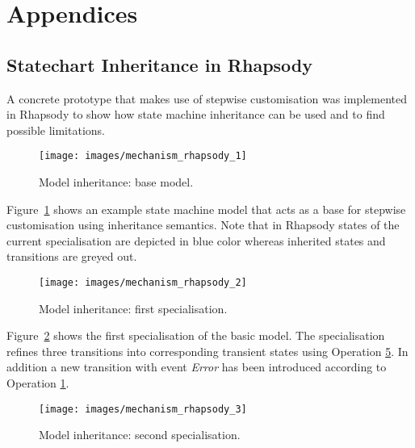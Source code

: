 \appendix

\section*{Appendices}
\renewcommand{\thesubsection}{\Alph{subsection}}

\label{annex:framework}

\subsection{Statechart Inheritance in Rhapsody\label{annex:proto_inheritance}}

A concrete prototype that makes use of stepwise customisation was implemented in Rhapsody to
show how state machine inheritance can be used and to find possible limitations.

\begin{figure}[H]
    \centering
    \texttt{[image: images/mechanism\_rhapsody\_1]}
    \caption{Model inheritance: base model.}
    \label{fig:mechanism_rhapsody_1}
\end{figure}

Figure~\ref{fig:mechanism_rhapsody_1} shows an example state machine model that acts as a base
for stepwise customisation using inheritance semantics. Note that in Rhapsody states of the
current specialisation are depicted in blue color whereas inherited states and transitions are
greyed out.

\clearpage

\begin{figure}[H]
    \centering
    \texttt{[image: images/mechanism\_rhapsody\_2]}
    \caption{Model inheritance: first specialisation.}
    \label{fig:mechanism_rhapsody_2}
\end{figure}

Figure~\ref{fig:mechanism_rhapsody_2} shows the first specialisation of the basic model.
The specialisation refines three transitions into corresponding transient states using
Operation \hyperref[sec:operation_5]{5}. In addition a new transition with event \textit{Error}
has been introduced according to Operation \hyperref[sec:operation_1]{1}.

\clearpage

\begin{figure}[H]
    \centering
    \texttt{[image: images/mechanism\_rhapsody\_3]}
    \caption{Model inheritance: second specialisation.}
    \label{fig:mechanism_rhapsody_3}
\end{figure}

